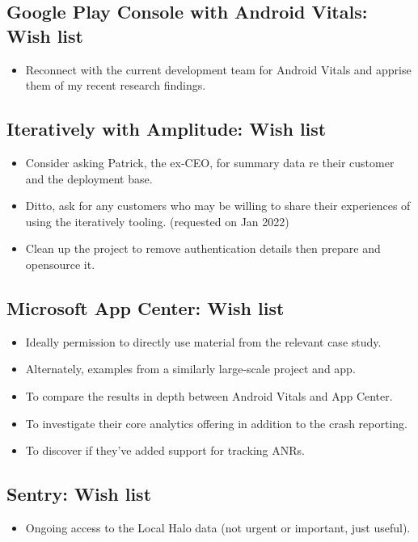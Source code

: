 \subsection*{Google Play Console with Android Vitals: Wish list}
{\small
\begin{itemize}
    \item Reconnect with the current development team for Android Vitals and apprise them of my recent research findings.
\end{itemize}
}

\subsection*{Iteratively with Amplitude: Wish list}
{\small
\begin{itemize}
    \item Consider asking Patrick, the ex-CEO, for summary data re their customer and the deployment base. 
    \item Ditto, ask for any customers who may be willing to share their experiences of using the iteratively tooling. (requested on  Jan 2022)
    \item Clean up the project to remove authentication details then prepare and opensource it.
\end{itemize}
}


\subsection*{Microsoft App Center: Wish list}
{\small
\begin{itemize}
    \item Ideally permission to directly use material from the relevant case study.
    \item Alternately, examples from a similarly large-scale project and app.
    \item To compare the results in depth between Android Vitals and App Center.
    \item To investigate their core analytics offering in addition to the crash reporting.
    \item To discover if they've added support for tracking ANRs.
\end{itemize}
}

\subsection*{Sentry: Wish list}
{\small
\begin{itemize}
    \item Ongoing access to the Local Halo data (not urgent or important, just useful).
\end{itemize}
}
